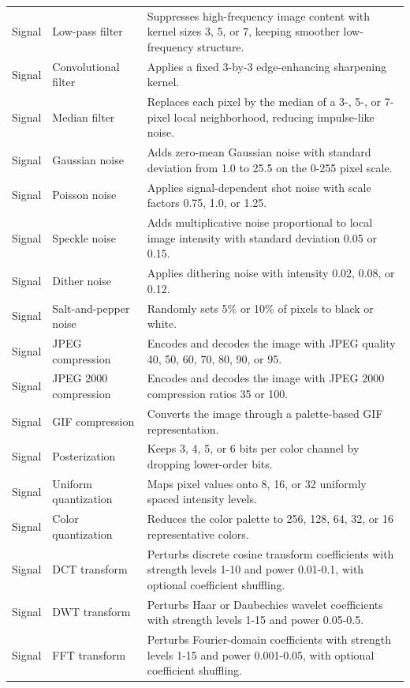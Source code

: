 {\begin{longtable}{@{}>{\raggedright\arraybackslash}p{} >{\raggedright\arraybackslash}p{} >{\raggedright\arraybackslash}p{}@{}}
Signal & Low-pass filter & Suppresses high-frequency image content with kernel sizes 3, 5, or 7, keeping smoother low-frequency structure. \\
Signal & Convolutional filter & Applies a fixed 3-by-3 edge-enhancing sharpening kernel. \\
Signal & Median filter & Replaces each pixel by the median of a 3-, 5-, or 7-pixel local neighborhood, reducing impulse-like noise. \\
Signal & Gaussian noise & Adds zero-mean Gaussian noise with standard deviation from 1.0 to 25.5 on the 0-255 pixel scale. \\
Signal & Poisson noise & Applies signal-dependent shot noise with scale factors 0.75, 1.0, or 1.25. \\
Signal & Speckle noise & Adds multiplicative noise proportional to local image intensity with standard deviation 0.05 or 0.15. \\
Signal & Dither noise & Applies dithering noise with intensity 0.02, 0.08, or 0.12. \\
Signal & Salt-and-pepper noise & Randomly sets 5\% or 10\% of pixels to black or white. \\
Signal & JPEG compression & Encodes and decodes the image with JPEG quality 40, 50, 60, 70, 80, 90, or 95. \\
Signal & JPEG 2000 compression & Encodes and decodes the image with JPEG 2000 compression ratios 35 or 100. \\
Signal & GIF compression & Converts the image through a palette-based GIF representation. \\
Signal & Posterization & Keeps 3, 4, 5, or 6 bits per color channel by dropping lower-order bits. \\
Signal & Uniform quantization & Maps pixel values onto 8, 16, or 32 uniformly spaced intensity levels. \\
Signal & Color quantization & Reduces the color palette to 256, 128, 64, 32, or 16 representative colors. \\
Signal & DCT transform & Perturbs discrete cosine transform coefficients with strength levels 1-10 and power 0.01-0.1, with optional coefficient shuffling. \\
Signal & DWT transform & Perturbs Haar or Daubechies wavelet coefficients with strength levels 1-15 and power 0.05-0.5. \\
Signal & FFT transform & Perturbs Fourier-domain coefficients with strength levels 1-15 and power 0.001-0.05, with optional coefficient shuffling. \\

\end{longtable}}
